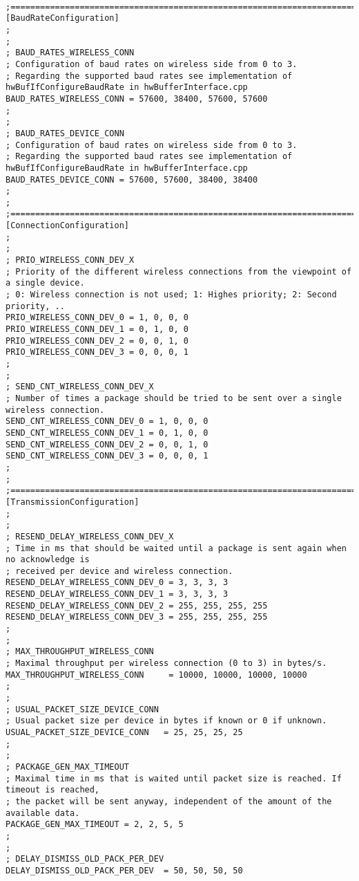 \begin{lstlisting}

;========================================================================================
[BaudRateConfiguration]
;
;
; BAUD_RATES_WIRELESS_CONN
; Configuration of baud rates on wireless side from 0 to 3.
; Regarding the supported baud rates see implementation of hwBufIfConfigureBaudRate in hwBufferInterface.cpp
BAUD_RATES_WIRELESS_CONN = 57600, 38400, 57600, 57600
;
;
; BAUD_RATES_DEVICE_CONN
; Configuration of baud rates on wireless side from 0 to 3.
; Regarding the supported baud rates see implementation of hwBufIfConfigureBaudRate in hwBufferInterface.cpp
BAUD_RATES_DEVICE_CONN = 57600, 57600, 38400, 38400
;
;
;========================================================================================
[ConnectionConfiguration]
;
;
; PRIO_WIRELESS_CONN_DEV_X
; Priority of the different wireless connections from the viewpoint of a single device.
; 0: Wireless connection is not used; 1: Highes priority; 2: Second priority, ..
PRIO_WIRELESS_CONN_DEV_0 = 1, 0, 0, 0
PRIO_WIRELESS_CONN_DEV_1 = 0, 1, 0, 0
PRIO_WIRELESS_CONN_DEV_2 = 0, 0, 1, 0
PRIO_WIRELESS_CONN_DEV_3 = 0, 0, 0, 1
;
;
; SEND_CNT_WIRELESS_CONN_DEV_X
; Number of times a package should be tried to be sent over a single wireless connection.
SEND_CNT_WIRELESS_CONN_DEV_0 = 1, 0, 0, 0
SEND_CNT_WIRELESS_CONN_DEV_1 = 0, 1, 0, 0
SEND_CNT_WIRELESS_CONN_DEV_2 = 0, 0, 1, 0
SEND_CNT_WIRELESS_CONN_DEV_3 = 0, 0, 0, 1
;
;
;========================================================================================
[TransmissionConfiguration]
;
;
; RESEND_DELAY_WIRELESS_CONN_DEV_X
; Time in ms that should be waited until a package is sent again when no acknowledge is 
; received per device and wireless connection.
RESEND_DELAY_WIRELESS_CONN_DEV_0 = 3, 3, 3, 3
RESEND_DELAY_WIRELESS_CONN_DEV_1 = 3, 3, 3, 3
RESEND_DELAY_WIRELESS_CONN_DEV_2 = 255, 255, 255, 255
RESEND_DELAY_WIRELESS_CONN_DEV_3 = 255, 255, 255, 255
;
;
; MAX_THROUGHPUT_WIRELESS_CONN
; Maximal throughput per wireless connection (0 to 3) in bytes/s.
MAX_THROUGHPUT_WIRELESS_CONN	 = 10000, 10000, 10000, 10000
;
;
; USUAL_PACKET_SIZE_DEVICE_CONN
; Usual packet size per device in bytes if known or 0 if unknown.
USUAL_PACKET_SIZE_DEVICE_CONN	= 25, 25, 25, 25
;
;
; PACKAGE_GEN_MAX_TIMEOUT
; Maximal time in ms that is waited until packet size is reached. If timeout is reached, 
; the packet will be sent anyway, independent of the amount of the available data.
PACKAGE_GEN_MAX_TIMEOUT	= 2, 2, 5, 5
;
;
; DELAY_DISMISS_OLD_PACK_PER_DEV
DELAY_DISMISS_OLD_PACK_PER_DEV	= 50, 50, 50, 50

\end{lstlisting}
